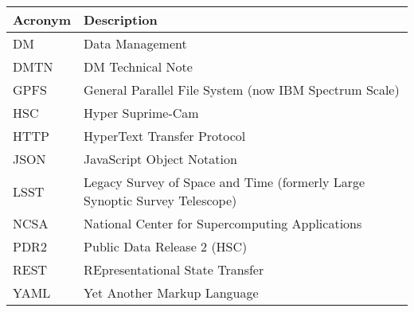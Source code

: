 \addtocounter{table}{-1}
\begin{longtable}{p{}p{}}\hline
\textbf{Acronym} & \textbf{Description}  \\\hline

DM & Data Management \\\hline
DMTN & DM Technical Note \\\hline
GPFS & General Parallel File System (now IBM Spectrum Scale) \\\hline
HSC & Hyper Suprime-Cam \\\hline
HTTP & HyperText Transfer Protocol \\\hline
JSON & JavaScript Object Notation \\\hline
LSST & Legacy Survey of Space and Time (formerly Large Synoptic Survey Telescope) \\\hline
NCSA & National Center for Supercomputing Applications \\\hline
PDR2 & Public Data Release 2 (HSC) \\\hline
REST & REpresentational State Transfer \\\hline
YAML & Yet Another Markup Language \\\hline
\end{longtable}
